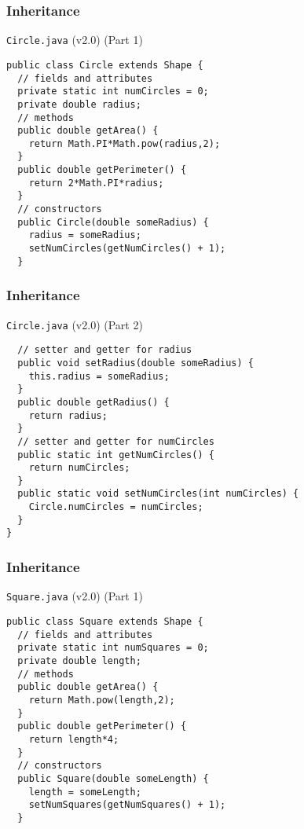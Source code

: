 \documentclass[10pt, compress]{beamer}
\begin{document}
\begin{frame}[fragile]
  \frametitle{Inheritance}
  \begin{block}{\texttt{Circle.java} (v2.0) (Part 1)}
    \begin{verbatim}
public class Circle extends Shape {
  // fields and attributes
  private static int numCircles = 0;
  private double radius;
  // methods
  public double getArea() {
    return Math.PI*Math.pow(radius,2);
  }
  public double getPerimeter() {
    return 2*Math.PI*radius;
  }
  // constructors
  public Circle(double someRadius) {
    radius = someRadius;
    setNumCircles(getNumCircles() + 1);
  }
    \end{verbatim}
  \end{block}
\end{frame}

\begin{frame}[fragile]
  \frametitle{Inheritance}
  \begin{block}{\texttt{Circle.java} (v2.0) (Part 2)}
    \begin{verbatim}
  // setter and getter for radius
  public void setRadius(double someRadius) {
    this.radius = someRadius;
  }
  public double getRadius() {
    return radius;
  }
  // setter and getter for numCircles
  public static int getNumCircles() {
    return numCircles;
  }
  public static void setNumCircles(int numCircles) {
    Circle.numCircles = numCircles;
  }
}
    \end{verbatim}
  \end{block}
\end{frame}

\begin{frame}[fragile]
  \frametitle{Inheritance}
  \begin{block}{\texttt{Square.java} (v2.0) (Part 1)}
    \begin{verbatim}
public class Square extends Shape {
  // fields and attributes
  private static int numSquares = 0;
  private double length;
  // methods
  public double getArea() {
    return Math.pow(length,2);
  }
  public double getPerimeter() {
    return length*4;
  }
  // constructors
  public Square(double someLength) {
    length = someLength;
    setNumSquares(getNumSquares() + 1);
  }
    \end{verbatim}
  \end{block}
\end{frame}
\end{document}
